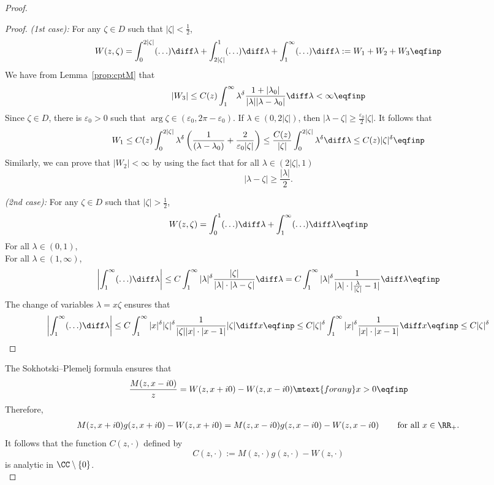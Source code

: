 \begin{proof}
\begin{proof}
\textit{(1st case): }For any $\zeta \in D$ such that $|\zeta| < \frac{1}{2}$, 
\begin{align*}
    W(z, \zeta) = \int_0^{2|\zeta|} (\ldots)\diff \lambda + \int_{2|\zeta|}^1 (\ldots) \diff \lambda + \int_1^\infty (\ldots) \diff \lambda := W_1 + W_2 + W_3 \eqfinp
\end{align*}
We have from Lemma~\ref{prop:cptM} that
    $$ |W_3| \leq C(z) \int_1^\infty \lambda^\delta \frac{1+|\lambda_0|}{|\lambda||\lambda - \lambda_0|} \diff \lambda < \infty \eqfinp$$
Since $\zeta \in D$, there is $\varepsilon_0 > 0$ such that $\arg \zeta \in (\varepsilon_0, 2\pi - \varepsilon_0)$. If $\lambda \in (0, 2|\zeta|)$, then $|\lambda-\zeta| \geq \frac{\varepsilon_0}{2}|\zeta|$. It follows that 
    $$ W_1 \leq C(z)\int_0^{2|\zeta|} \lambda^\delta \left(\frac{1}{(\lambda-\lambda_0)}+ \frac{2}{\varepsilon_0 |\zeta|}\right) \leq \frac{C(z)}{|\zeta|} \int_0^{2|\zeta|} \lambda^\delta \diff \lambda \leq C(z)|\zeta|^\delta \eqfinp$$
Similarly, we can prove that $|W_2| < \infty$ by using the fact that for all $\lambda \in (2|\zeta|, 1)$ $$|\lambda-\zeta|\geq\frac{|\lambda|}{2}.$$

\textit{(2nd case):} For any $\zeta \in D$ such that $|\zeta| > \frac{1}{2}$, 
\begin{align*}
    W(z, \zeta) = \int_0^{1} (\ldots)\diff \lambda + \int_1^\infty (\ldots) \diff \lambda \eqfinp
\end{align*} 
For all $\lambda \in (0,1)$, \\
For all $\lambda \in (1, \infty)$, 
   $$\left| \int_1^\infty (\ldots) \diff \lambda \right|
   \leq C \int_1^\infty |\lambda|^\delta \frac{|\zeta|} {|\lambda|\cdot|\lambda-\zeta|} \diff \lambda  
   = C \int_1^\infty |\lambda|^\delta \frac{1} {|\lambda|\cdot|\frac{\lambda}{|\zeta|}-1|} \diff \lambda \eqfinp$$
The change of variables $\lambda = x \zeta$ ensures that 
    $$ 
    \left| \int_1^\infty (\ldots) \diff \lambda \right|
    \leq 
    C \int_1^\infty |x|^\delta |\zeta|^\delta \frac{1} {|\zeta||x|\cdot|x-1|} |\zeta|\diff x \eqfinp
    \leq 
    C |\zeta|^\delta \int_1^\infty |x|^\delta \frac{1}{|x|\cdot|x-1|}\diff x \eqfinp
    \leq C |\zeta|^\delta
    $$
\end{proof}


The Sokhotski–Plemelj formula ensures that 
\begin{align*}
    \frac{M(z,x-i0)}{z}
    = 
    W(z,x+i0) - W(z,x-i0)
    \mtext{for any}
    x > 0
    \eqfinp
\end{align*}
Therefore, 
\begin{align*}
    M(z,x+i0)g(z, x+i0) -W(z,x+i0) = M(z,x-i0)g(z, x-i0) - W(z,x-i0) \, \qquad \text{for all $x\in\RR_+$}.
\end{align*}
It follows that the function $C(z,\cdot)$ defined by 
$$ C(z,\cdot) := M(z,\cdot)g(z,\cdot) - W(z,\cdot)$$
is analytic in $\CC \setminus \{0\}$.\\



\end{proof}
